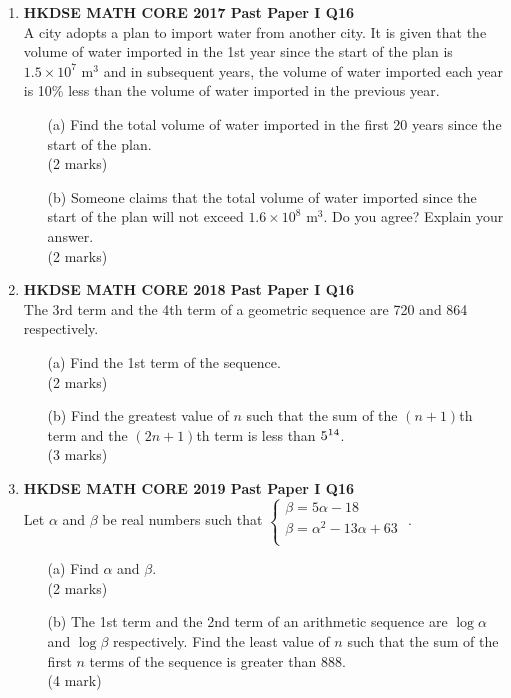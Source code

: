 \documentclass[12pt]{article}
\begin{document}
\begin{enumerate}
	\item \textbf{HKDSE MATH CORE 2017 Past Paper I Q16}\\
	A city adopts a plan to import water from another city. It is given that the volume of water imported in the 1st year since the start of the plan is $1.5 \times 10^7$ m$^3$ and in subsequent years, the volume of water imported each year is 10\% less than the volume of water imported in the previous year.
	\begin{enumerate}
		\item[(a)] Find the total volume of water imported in the first 20 years since the start of the plan. \\(2 marks) 
		\item[(b)] Someone claims that the total volume of water imported since the start of the plan will not exceed $1.6 \times 10^8$ m$^3$. Do you agree? Explain your answer. \\(2 marks)
	\end{enumerate}

    \item \textbf{HKDSE MATH CORE 2018 Past Paper I Q16}\\
	The 3rd term and the 4th term of a geometric sequence are 720 and 864 respectively.
	\begin{enumerate}
		\item[(a)] Find the 1st term of the sequence. \\(2 marks)
		\item[(b)] Find the greatest value of $n$ such that the sum of the $(n + 1)$th term and the $(2n + 1)$th term is less than $5 \time 10^{14}$. \\(3 marks)
	\end{enumerate}

    \item \textbf{HKDSE MATH CORE 2019 Past Paper I Q16}\\
	Let $\alpha$ and $\beta$ be real numbers such that $\left\{\begin{matrix}
		\beta  =  5\alpha  -  18 \\
		\beta = \alpha^2 - 13\alpha + 63\\
		\end{matrix}\right.$ .
	\begin{enumerate}
		\item[(a)] Find $\alpha$ and $\beta$. \\(2 marks)
		\item[(b)] The 1st term and the 2nd term of an arithmetic sequence are $\log{\alpha}$ and $\log{\beta}$ respectively. Find the least value of $n$ such that the sum of the first $n$ terms of the sequence is greater than 888. \\(4 mark)
	\end{enumerate}


\end{enumerate}
\end{document}
